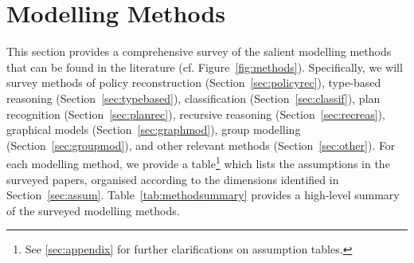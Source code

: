 \documentclass[final,1p,times,authoryear]{elsarticle}
\begin{document}


	\section{Modelling Methods} \label{sec:methods}

This section provides a comprehensive survey of the salient modelling methods that can be found in the literature (cf. Figure~\ref{fig:methods}). Specifically, we will survey methods of policy reconstruction (Section~\ref{sec:policyrec}), type-based reasoning (Section~\ref{sec:typebased}), classification (Section~\ref{sec:classif}), plan recognition (Section~\ref{sec:planrec}), recursive reasoning (Section~\ref{sec:recreas}), graphical models (Section~\ref{sec:graphmod}), group modelling (Section~\ref{sec:groupmod}), and other relevant methods (Section~\ref{sec:other}). For each modelling method, we provide a table\footnote{See \ref{sec:appendix} for further clarifications on assumption tables.} which lists the assumptions in the surveyed papers, organised according to the dimensions identified in Section~\ref{sec:assum}. Table~\ref{tab:methodsummary} provides a high-level summary of the surveyed modelling methods.
\end{document}
